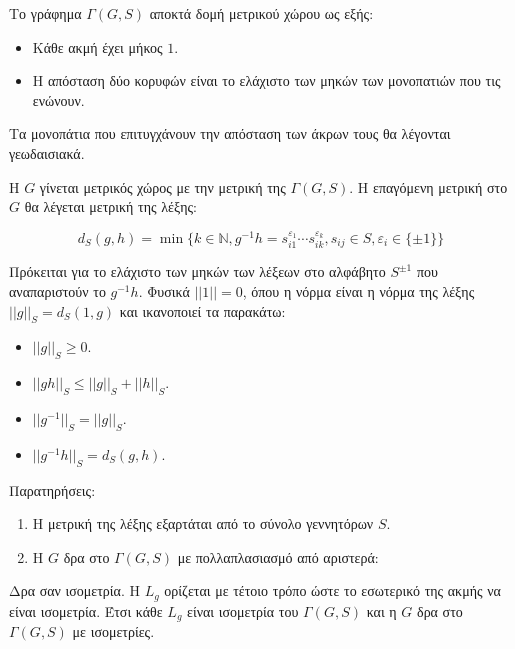 \documentclass[oneside,a4paper]{article}
\begin{document}
\noindent Το γράφημα $\Gamma(G,S)$ αποκτά δομή μετρικού χώρου ως εξής:

\begin{itemize}
	\item Κάθε ακμή έχει μήκος $1$.
	\item Η απόσταση δύο κορυφών είναι το ελάχιστο των μηκών των μονοπατιών που τις ενώνουν.
\end{itemize}

\noindent Τα μονοπάτια που επιτυγχάνουν την απόσταση των άκρων τους θα λέγονται γεωδαισιακά.

\noindent Η $G$ γίνεται μετρικός χώρος με την μετρική της $\Gamma(G,S)$. Η επαγόμενη μετρική στο $G$ θα λέγεται μετρική της λέξης:

$$d_S(g,h) = \min \{k \in \mathbb{N}, g^{-1}h = s^{\varepsilon_1}_{i1} \cdots s^{\varepsilon_k}_{ik}, s_{ij} \in S, \varepsilon_i \in \{\pm 1\} \}$$

\noindent Πρόκειται για το ελάχιστο των μηκών των λέξεων στο αλφάβητο $S^{\pm 1}$ που αναπαριστούν το $g^{-1}h$. Φυσικά $ ||1|| = 0$, όπου η νόρμα είναι η νόρμα της λέξης $||g||_S = d_S (1,g)$ και ικανοποιεί τα παρακάτω:

\begin{itemize}
	\item $||g||_S \geq 0$.
	\item $||gh||_S \leq ||g||_S + ||h||_S$.
	\item $||g^{-1}||_S = ||g||_S$.
	\item $||g^{-1}h||_S = d_S(g,h)$.
\end{itemize}

\noindent Παρατηρήσεις:

\begin{enumerate} 
	\item Η μετρική της λέξης εξαρτάται από το σύνολο γεννητόρων $S$.
	\item Η $G$ δρα στο $\Gamma(G,S)$ με πολλαπλασιασμό από αριστερά:
	\begin{figure}[ht]
		\centering
\end{figure}
\end{enumerate}
\noindent Δρα σαν ισομετρία. Η $L_g$ ορίζεται με τέτοιο τρόπο ώστε το εσωτερικό της ακμής να είναι ισομετρία. Έτσι κάθε $L_g$ είναι ισομετρία του $\Gamma(G,S)$ και η $G$ δρα στο $\Gamma(G,S)$ με ισομετρίες.
\end{document}
